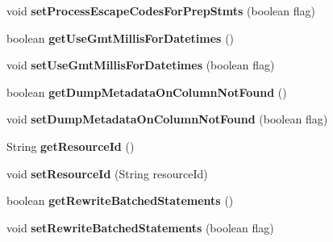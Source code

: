 \begin{DoxyCompactItemize}
void {\bfseries set\+Process\+Escape\+Codes\+For\+Prep\+Stmts} (boolean flag)
\item 
\mbox{\label{classcom_1_1mysql_1_1jdbc_1_1_connection_properties_impl_ac1afb37ecf61faeff334f9d1698881cb}} 
boolean {\bfseries get\+Use\+Gmt\+Millis\+For\+Datetimes} ()
\item 
\mbox{\label{classcom_1_1mysql_1_1jdbc_1_1_connection_properties_impl_ab86a8a345718218715c1fb62bc30c0d2}} 
void {\bfseries set\+Use\+Gmt\+Millis\+For\+Datetimes} (boolean flag)
\item 
\mbox{\label{classcom_1_1mysql_1_1jdbc_1_1_connection_properties_impl_a1fb0ff11a578d8be33f1d3244012d405}} 
boolean {\bfseries get\+Dump\+Metadata\+On\+Column\+Not\+Found} ()
\item 
\mbox{\label{classcom_1_1mysql_1_1jdbc_1_1_connection_properties_impl_a9b3b072f3a20efa82847e462afd370d0}} 
void {\bfseries set\+Dump\+Metadata\+On\+Column\+Not\+Found} (boolean flag)
\item 
\mbox{\label{classcom_1_1mysql_1_1jdbc_1_1_connection_properties_impl_a6f0719dd859b29dc420f3a4f6b1f3f85}} 
String {\bfseries get\+Resource\+Id} ()
\item 
\mbox{\label{classcom_1_1mysql_1_1jdbc_1_1_connection_properties_impl_a460dcb783234bcf40aec54861be72dc0}} 
void {\bfseries set\+Resource\+Id} (String resource\+Id)
\item 
\mbox{\label{classcom_1_1mysql_1_1jdbc_1_1_connection_properties_impl_ad5920a9b3096ab435126859e80d04978}} 
boolean {\bfseries get\+Rewrite\+Batched\+Statements} ()
\item 
\mbox{\label{classcom_1_1mysql_1_1jdbc_1_1_connection_properties_impl_a219351df82004bf5aee305680e550676}} 
void {\bfseries set\+Rewrite\+Batched\+Statements} (boolean flag)

\end{DoxyCompactItemize}

